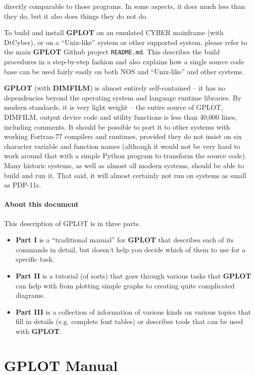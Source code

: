 \documentclass[a4paper,twoside,11pt]{article}
\newcommand{\newpara}{\par\vspace{4mm}\noindent}
\begin{document}
directly comparable to those programs. In some aspects, it does much less than they do, but it also does
things they do not do.
\newpara
To build and install \textbf{GPLOT} on an emulated CYBER mainframe (with DtCyber), or on a ``Unix-like'' system or
other supported system,
please refer to the main \textbf{GPLOT} Github project \texttt{README.md}. This describes the build procedures in
a step-by-step fashion and also explains how a single source code base can be used fairly easily on both NOS and
``Unix-like'' and other systems.
\newpara
\textbf{GPLOT} (with \textbf{DIMFILM}) is almost entirely self-contained -- it has no dependencies beyond the operating
system and language runtime libraries. By modern standards, it is very light weight -- the entire source of
GPLOT, DIMFILM, output device code and utility functions is less than 40,000 lines, including comments. It should be possible to
port it to other systems with working Fortran-77 compilers and runtimes, provided they do not insist on six character
variable and function names (although it would not be very hard to work around that with a simple Python program
to transform the source code). Many historic systems, as well as almost all modern systems, should be able to
build and run it. That said, it will almost certainly not run on systems as small as PDP-11s.

\subsection{About this document}
This description of GPLOT is in three parts.

\begin{itemize}
\item \textbf{Part I} is a ``traditional manual'' for \textbf{GPLOT} that describes each of its commands in detail, but doesn't help
  you decide which of them to use for a specific task.
\item \textbf{Part II} is a tutorial (of sorts) that goes through various tasks that \textbf{GPLOT} can help with from plotting
  simple graphs to creating quite complicated diagrams.
\item \textbf{Part III} is a collection of information of various kinds on various topics that fill in details (e.g.
  complete font tables) or describes tools that can be used with \textbf{GPLOT}.
\end{itemize}

\clearpage
\part{\textbf{GPLOT} Manual}
\clearpage
\end{document}

